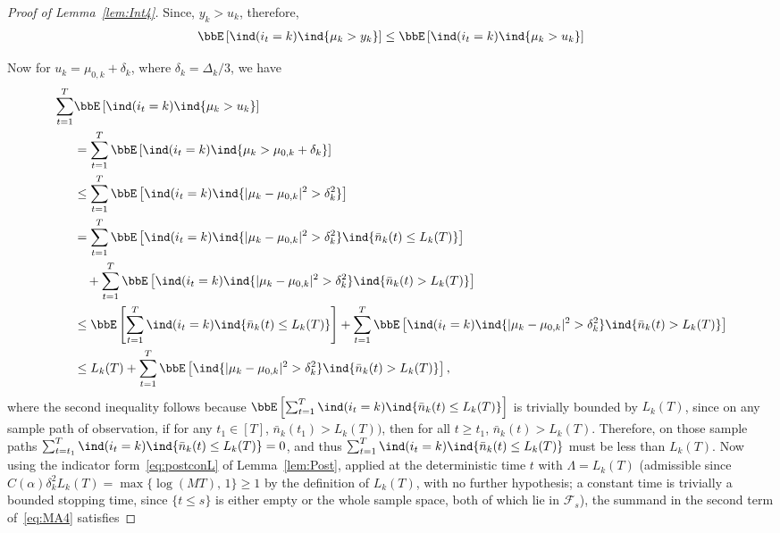 \documentclass[11pt]{article}
\begin{document}
\begin{proof}[Proof of Lemma~\ref{lem:Int4}]
Since, $y_k>u_k$, therefore,
\begin{align}
    \bbE\left[  \ind(i_t=k )  \ind\{\mu_k > y_k  \}   \right] \leq \bbE\left[  \ind(i_t=k )  \ind\{\mu_k > u_k  \}   \right] 
\end{align}

Now for $u_k = \mu_{0,k}+\delta_k$, where $\delta_k=\Delta_k/3$, we have
\begin{align}
    \nonumber
     \sum_{t=1}^{T}&\bbE\left[  \ind(i_t=k )  \ind\{\mu_k > u_k  \}   \right]  
     \\
     \nonumber
     &= \sum_{t=1}^{T} \bbE\left[  \ind(i_t=k )  \ind\{\mu_k > \mu_{0,k}+\delta_k  \}   \right] 
     \\
     \nonumber
     &\le \sum_{t=1}^{T} \bbE\left[  \ind(i_t=k )  \ind\{|\mu_k - \mu_{0,k}|^2>\delta_k^2  \}   \right]
     \\
     \nonumber
     &=\sum_{t=1}^{T} \bbE\left[  \ind(i_t=k )  \ind\{|\mu_k - \mu_{0,k}|^2>\delta_k^2  \}  \ind\{\bar n_k(t) \leq L_k(T)\} \right] 
     \\
     \nonumber
      &\quad +\sum_{t=1}^{T} \bbE\left[  \ind(i_t=k )  \ind\{|\mu_k - \mu_{0,k}|^2>\delta_k^2  \}  \ind\{\bar n_k(t) > L_k(T)\} \right]
     \\
     \nonumber
     &\leq  \bbE\left[  \sum_{t=1}^{T} \ind(i_t=k )    \ind\{\bar n_k(t) \leq L_k(T)\} \right] +\sum_{t=1}^{T} \bbE\left[  \ind(i_t=k )  \ind\{|\mu_k - \mu_{0,k}|^2>\delta_k^2  \}  \ind\{\bar n_k(t) > L_k(T)\} \right]
     \\
     &\leq  L_k(T) +\sum_{t=1}^{T} \bbE\left[   \ind\{|\mu_k - \mu_{0,k}|^2>\delta_k^2  \}  \ind\{\bar n_k(t) > L_k(T)\} \right],
     \label{eq:MA4}
\end{align}
where the second inequality follows because $\bbE\left[ \sum_{t=1}^{T} \ind(i_t=k )  \ind\{\bar n_k(t) \leq L_k(T)\} \right]$ is trivially bounded by $L_k(T)$, since on any sample path of observation, if for any $t_1\in[T]$, $\bar n_k(t_1)> L_k(T))$, then for all $t\geq t_1$, $\bar n_k(t)>L_k(T)$. Therefore, on those sample paths $\sum_{t=t_1}^{T} \ind(i_t=k)  \ind\{\bar n_k(t) \leq L_k(T)\}=0$, and thus $\sum_{t=1}^{T} \ind(i_t=k )  \ind\{\bar n_k(t) \leq L_k(T)\}$ must be less than $L_k(T)$.
Now using the indicator form~\eqref{eq:postconL} of Lemma~\ref{lem:Post}, applied at the deterministic time $t$ with $\Lambda = L_k(T)$ (admissible since $C(\alpha)\delta_k^2 L_k(T) = \max\{\log(MT),\,1\} \geq 1$ by the definition of $L_k(T)$, with no further hypothesis; a constant time is trivially a bounded stopping time, since $\{t \leq s\}$ is either empty or the whole sample space, both of which lie in $\mathcal{F}_s$), the summand in the second term of~\eqref{eq:MA4} satisfies

\end{proof}
\end{document}
